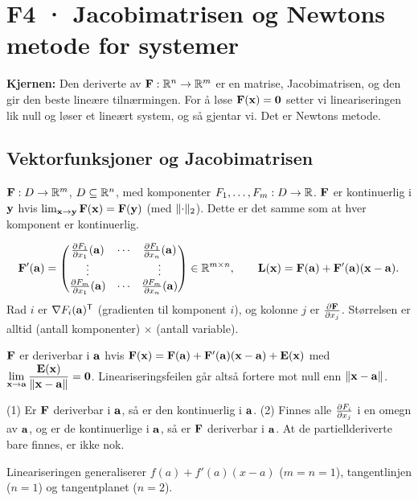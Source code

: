 \section{F4 · Jacobimatrisen og Newtons metode for systemer}

\textbf{Kjernen:} Den deriverte av $\mathbf{F}:\mathbb{R}^n\to\mathbb{R}^m$ er en matrise, Jacobimatrisen, og den gir den beste lineære tilnærmingen. For å løse $\mathbf{F}(\mathbf{x})=\mathbf{0}$ setter vi lineariseringen lik null og løser et lineært system, og så gjentar vi. Det er Newtons metode.

\subsection{Vektorfunksjoner og Jacobimatrisen}
\begin{defn}
$\mathbf{F}:D\to\mathbb{R}^m$, $D\subseteq\mathbb{R}^n$, med komponenter $F_1,\dots,F_m:D\to\mathbb{R}$. $\mathbf{F}$ er kontinuerlig i $\mathbf{y}$ hvis $\lim_{\mathbf{x}\to\mathbf{y}}\mathbf{F}(\mathbf{x})=\mathbf{F}(\mathbf{y})$ (med $\lVert \cdot\rVert_2$). Dette er det samme som at hver komponent er kontinuerlig.
\end{defn}

\begin{formel}
\[
\mathbf{F}'(\mathbf{a})=\begin{pmatrix}\frac{\partial F_1}{\partial x_1}(\mathbf{a})&\cdots&\frac{\partial F_1}{\partial x_n}(\mathbf{a})\\ \vdots&&\vdots\\ \frac{\partial F_m}{\partial x_1}(\mathbf{a})&\cdots&\frac{\partial F_m}{\partial x_n}(\mathbf{a})\end{pmatrix}\in\mathbb{R}^{m\times n},\qquad
\mathbf{L}(\mathbf{x})=\mathbf{F}(\mathbf{a})+\mathbf{F}'(\mathbf{a})(\mathbf{x}-\mathbf{a}).
\]
Rad $i$ er $\nabla F_i(\mathbf{a})^{\mathsf{T}}$ (gradienten til komponent $i$), og kolonne $j$ er $\frac{\partial \mathbf{F}}{\partial x_j}$. Størrelsen er alltid (antall komponenter) $\times$ (antall variable).
\end{formel}

\begin{defn}[deriverbarhet]
$\mathbf{F}$ er deriverbar i $\mathbf{a}$ hvis $\mathbf{F}(\mathbf{x})=\mathbf{F}(\mathbf{a})+\mathbf{F}'(\mathbf{a})(\mathbf{x}-\mathbf{a})+\mathbf{E}(\mathbf{x})$ med $\displaystyle\lim_{\mathbf{x}\to\mathbf{a}}\frac{\mathbf{E}(\mathbf{x})}{\lVert \mathbf{x}-\mathbf{a}\rVert}=\mathbf{0}$. Lineariseringsfeilen går altså fortere mot null enn $\lVert \mathbf{x}-\mathbf{a}\rVert$.
\end{defn}
\begin{teorem}
(1) Er $\mathbf{F}$ deriverbar i $\mathbf{a}$, så er den kontinuerlig i $\mathbf{a}$. (2) Finnes alle $\frac{\partial F_i}{\partial x_j}$ i en omegn av $\mathbf{a}$, og er de kontinuerlige i $\mathbf{a}$, så er $\mathbf{F}$ deriverbar i $\mathbf{a}$. At de partiellderiverte bare finnes, er ikke nok.
\end{teorem}
Lineariseringen generaliserer $f(a)+f'(a)(x-a)$ ($m=n=1$), tangentlinjen ($n=1$) og tangentplanet ($n=2$).

